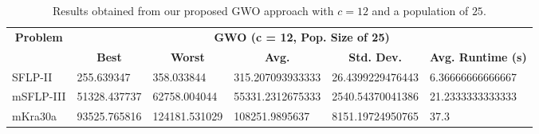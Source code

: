 \begin{table}[h!]
\begin{adjustwidth}{-1.18in}{}
	\centering
	\begin{tabular}{|l|l|l|l|l|l|}
	\hline
	\multicolumn{1}{|c|}{\multirow{2}{*}{\textbf{Problem}}} & \multicolumn{5}{c|}{\textbf{GWO (c = 12, Pop. Size of 25)}} \\ \cline{2-6} 
	\multicolumn{1}{|c|}{}                                  & \multicolumn{1}{c|}{\textbf{Best}} & \multicolumn{1}{c|}{\textbf{Worst}} & \multicolumn{1}{c|}{\textbf{Avg.}} & \multicolumn{1}{c|}{\textbf{Std. Dev.}} & \multicolumn{1}{c|}{\textbf{Avg. Runtime (s)}} \\ \hline
	SFLP-II                                                 & 255.639347                                  & 358.033844                                   & 315.207093933333                      & 26.4399229476443                                 & 6.36666666666667                                  \\ \hline
	mSFLP-III                                               & 51328.437737                                & 62758.004044                                 & 55331.2312675333						         & 2540.54370041386                              & 21.2333333333333                              \\ \hline
	mKra30a                                               & 93525.765816                                & 124181.531029                                 &
	108251.9895637							&
	8151.19724950765							&
	37.3						\\ \hline
	\end{tabular}
\end{adjustwidth}
\caption{Results obtained from our proposed GWO approach with $c = 12$ and a population of $25$.}
\label{approach-gwo-c12-p25-results}
\end{table}

